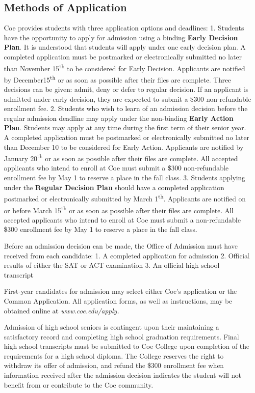 \documentclass[
  letterpaper,
]{scrbook}
\begin{document}
\subsection{Methods of Application}\label{methods-of-application}

Coe provides students with three application options and deadlines: 1.
Students have the opportunity to apply for admission using a binding
\textbf{Early Decision Plan}. It is understood that students will apply
under one early decision plan. A completed application must be
postmarked or electronically submitted no later than November
15\textsuperscript{th} to be considered for Early Decision. Applicants
are notified by December15\textsuperscript{th} or as soon as possible
after their files are complete. Three decisions can be given: admit,
deny or defer to regular decision. If an applicant is admitted under
early decision, they are expected to submit a \$300 non-refundable
enrollment fee. 2. Students who wish to learn of an admission decision
before the regular admission deadline may apply under the non-binding
\textbf{Early Action Plan}. Students may apply at any time during the
first term of their senior year. A completed application must be
postmarked or electronically submitted no later than December 10 to be
considered for Early Action. Applicants are notified by January
20\textsuperscript{th} or as soon as possible after their files are
complete. All accepted applicants who intend to enroll at Coe must
submit a \$300 non-refundable enrollment fee by May 1 to reserve a place
in the fall class. 3. Students applying under the \textbf{Regular
Decision Plan} should have a completed application postmarked or
electronically submitted by March 1\textsuperscript{th}. Applicants are
notified on or before March 15\textsuperscript{th} or as soon as
possible after their files are complete. All accepted applicants who
intend to enroll at Coe must submit a non-refundable \$300 enrollment
fee by May 1 to reserve a place in the fall class.

Before an admission decision can be made, the Office of Admission must
have received from each candidate: 1. A completed application for
admission 2. Official results of either the SAT or ACT examination 3. An
official high school transcript

First-year candidates for admission may select either Coe's application
or the Common Application. All application forms, as well as
instructions, may be obtained online at \emph{www.coe.edu/apply.}

Admission of high school seniors is contingent upon their maintaining a
satisfactory record and completing high school graduation requirements.
Final high school transcripts must be submitted to Coe College upon
completion of the requirements for a high school diploma. The College
reserves the right to withdraw its offer of admission, and refund the
\$300 enrollment fee when information received after the admission
decision indicates the student will not benefit from or contribute to
the Coe community.
\end{document}
